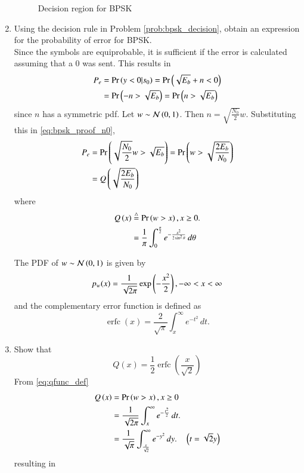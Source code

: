 \documentclass[journal,12pt,twocolumn]{IEEEtran}
\renewcommand\thesection{\arabic{section}}
\begin{document}
\begin{enumerate}[label=\thesection.\arabic*.,ref=\thesection.\theenumi]
\begin{figure}[!ht]
		\resizebox{\columnwidth}{!}{}
\caption{Decision region for BPSK}
\label{fig:ee18btech11042_2}
\end{figure}

\item
Using the decision rule in Problem \ref{prob:bpsk_decision}, obtain an expression for the probability of error for BPSK.
\\
\solution
Since the symbols are equiprobable, it is sufficient if the error is calculated assuming that a 0 was sent.  This results in
\begin{align}
P_e &= \Pr\left(y < 0|s_0\right) = \Pr\left(\sqrt{E_b} + n < 0\right)
\\
&= \Pr\left( -n > \sqrt{E_b} \right) = \Pr\left( n > \sqrt{E_b} \right)
\label{eq:bpsk_proof_n0}
\end{align}
since $n$ has a symmetric pdf.
Let $w \sim \mathcal{N}\left(0,1\right)$.  Then $n = \sqrt{\frac{N_0}{2}}w$. Substituting this in \eqref{eq:bpsk_proof_n0},
\begin{align}
P_e &=  \Pr\left( \sqrt{\frac{N_0}{2}}w > \sqrt{E_b} \right) = \Pr\left( w > \sqrt{\frac{2E_b}{N_0}} \right)
\\
&= Q\left(\sqrt{\frac{2E_b}{N_0}}\right)
\end{align}
%
where 
\begin{align}
\label{eq:qfunc_def}
Q\left(x\right) &\stackrel{\triangle}{=} \Pr\left(w > x\right), x \ge 0 .
\\
&= \frac{1}{\pi}\int^{\frac{\pi}{2}}_{0}e^{-\frac{x^2}{2\sin^2 \theta}}\,d\theta
\end{align}

The PDF of $w \sim \mathcal{N}\left(0,1\right)$ is given by
%
\begin{equation}
p_{w}(x) = \frac{1}{\sqrt{2\pi}}\exp\left(-\frac{x^2}{2}\right), -\infty < x < \infty
\end{equation}
and the complementary error function is defined as
\begin{equation}
\operatorname {erfc} (x)={\frac {2}{\sqrt {\pi }}}\int _{x}^{\infty }e^{-t^{2}}\,dt.
\label{eq:erfc}
\end{equation}
%
\item
Show that 
\begin{equation}
Q(x) = \frac{1}{2}\operatorname {erfc}\left({\frac  {x}{{\sqrt  {2}}}}\right)
\label{eq:qerfc}
\end{equation}
\solution From \eqref{eq:qfunc_def}
\begin{align}
Q\left(x\right)& = \Pr\left(w > x\right), x \ge 0 
\\
&= \frac {1}{\sqrt {2\pi }}\int _{x}^{\infty }e^{-\frac{t^{2}}{2}}\,dt.
\\
&= \frac {1}{\sqrt {\pi }}\int _{\frac{x}{\sqrt{2}}}^{\infty }e^{-y^{2}}\,dy. \quad \left(t = \sqrt{2}y\right)
\end{align}
%
resulting in \label{eq:qerfc}


\end{enumerate}
\end{document}
